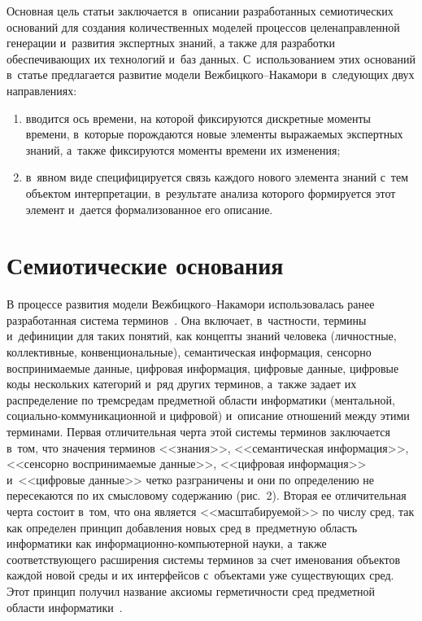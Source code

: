 {\begin{multicols}{2}
\renewcommand{\thefootnote}{\arabic{footnote}}


      Основная цель статьи заключается в~описании разработанных семиотических 
оснований для создания количественных моделей процессов целенаправленной генерации 
и~развития экспертных знаний, а также для разработки обеспечивающих их технологий и~баз 
данных. С~использованием этих оснований в~статье предлагается развитие модели 
Веж\-биц\-ко\-го--На\-ка\-мо\-ри в~следующих двух на\-прав\-ле\-ниях:
      \begin{enumerate}[(1)]
\item вводится ось времени, на которой фиксируют\-ся дискретные моменты времени, 
в~которые по\-рож\-да\-ют\-ся новые элементы вы\-ра\-жа\-емых экспертных знаний, а~также 
фиксируются моменты времени их изменения;
\item в~явном виде специфицируется связь каждого нового элемента знаний с~тем 
объектом интерпретации, в~результате анализа которого формируется этот элемент 
и~дается формализованное его описание.
\end{enumerate}




\section{Семиотические основания}

      В процессе развития модели Веж\-биц\-ко\-го--На\-ка\-мо\-ри использовалась ранее 
разработанная система терминов~\cite{9-zat, 10-zat}. Она включает, в~част\-ности,\linebreak
термины и~дефиниции для таких понятий, как\linebreak
 кон\-цеп\-ты знаний человека (личностные, коллективные, 
конвенциональные), семантическая информация, сен\-сор\-но вос\-при\-ни\-ма\-емые данные, 
циф\-ро\-вая информация, циф\-ро\-вые данные, циф\-ро\-вые коды нескольких категорий и~ряд 
других терминов, а~также задает их распределение по трем\linebreak средам предметной области 
информатики (ментальной, со\-ци\-аль\-но-ком\-му\-ни\-ка\-ци\-он\-ной и цифровой) 
и~описание отношений между этими терминами. Первая отличительная черта этой системы\linebreak 
терминов заключается в~том, что значения терминов <<знания>>, <<семантическая 
информация>>, <<сен\-сор\-но вос\-при\-ни\-ма\-емые данные>>, <<цифровая инфор\-мация>> 
и~<<цифровые данные>> четко разграничены и они по определению не пересекаются по их 
смысловому содержанию (рис.~2). Вторая ее отличительная черта состоит в~том, что она 
является <<масштабируемой>> по числу сред, так как определен принцип добавления 
новых сред в~предметную область информатики как ин\-фор\-ма\-ци\-он\-но-ком\-пьютерной науки, 
а~также соответствующего расширения системы терминов за счет именования объектов 
каждой новой среды и их интерфейсов с~объектами уже существующих сред. Этот принцип 
получил название аксиомы герметичности сред предметной области 
информатики~\cite{12-zat, 11-zat}.
      

\end{multicols}}
